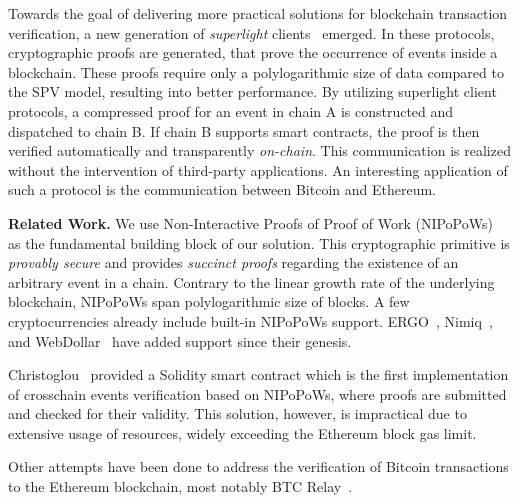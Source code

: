 Towards the goal of delivering more practical solutions for blockchain
transaction verification, a new generation of \emph{superlight}
clients~\cite{popow, nipopows, compactsuperblocks, flyclient} emerged. In these
protocols, cryptographic proofs are generated, that prove the occurrence of
events inside a blockchain. These proofs require only a polylogarithmic size of
data compared to the SPV model, resulting into better performance. By utilizing
superlight client protocols, a compressed proof for an event in chain A is
constructed and dispatched to chain B. If chain B supports smart contracts, the
proof is then verified automatically and transparently \emph{on-chain}. This
communication is realized without the intervention of third-party applications.
An interesting application of such a protocol is the communication between
Bitcoin and Ethereum.

\noindent

\textbf{Related Work.} We use Non-Interactive Proofs of Proof of Work
(NIPoPoWs)~\cite{nipopows, pow-sidechains} as the fundamental building block of
our solution. This cryptographic primitive is \emph{provably secure} and
provides \emph{succinct proofs} regarding the existence of an arbitrary event
in a chain. Contrary to the linear growth rate of the underlying blockchain,
NIPoPoWs span polylogarithmic size of blocks. A few cryptocurrencies already
include built-in NIPoPoWs support. ERGO~\cite{ergo}, Nimiq~\cite{nimiq}, and
WebDollar~\cite{webdollar} have added support since their genesis.

Christoglou~\cite{gglou} provided a Solidity smart contract which is the first
implementation of crosschain events verification based on NIPoPoWs, where
proofs are submitted and checked for their validity. This solution, however, is
impractical due to extensive usage of resources, widely exceeding the Ethereum
block gas limit.

Other attempts have been done to address the verification of Bitcoin
transactions to the Ethereum blockchain, most notably BTC
Relay~\cite{btcrelay}.

\noindent

